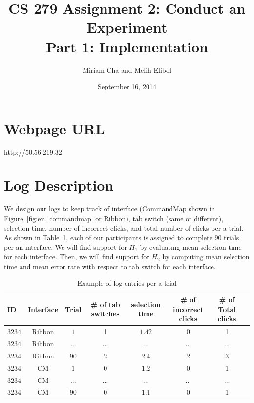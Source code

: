 \documentclass{article}
\title{CS 279 Assignment 2: Conduct an Experiment\\Part 1: Implementation}
\author{Miriam Cha and Melih Elibol}
\date{September 16, 2014}
\begin{document}
\maketitle

\section*{Webpage URL}
http://50.56.219.32
\section*{Log Description} 
 We design our logs to keep track of interface (CommandMap shown in Figure~\ref{fig:ex_commandmap} or Ribbon), tab switch (same or different),  selection time, number of incorrect clicks, and total number of clicks per a trial. As shown in Table~\ref{fig:trial_log}, each of our participants is assigned to complete $90$ trials per an interface. We will find support for $H_1$ by evaluating mean selection time for each interface. Then, we will find support for $H_2$ by computing mean selection time and mean error rate with respect to tab switch for each interface.  
 \begin{table}[tbh]
  \centering
\begin{tabular}{|l|c|c|c|c|c|c|c|}
  \hline
 ID &  Interface  &  Trial &  # of tab switches & selection time & \# of incorrect clicks & \# of Total clicks              \\\hline
 $3234$ &   Ribbon  & $1$  & 1  & $1.42$ & 0  &1 \\ \hline
$3234$  &    Ribbon &   $...$ & ...  & ... &  ... & ...\\\hline       
$3234$  &    Ribbon &   $90$ & 2  & $2.4$ &2  &3 \\\hline      
$3234$  &    CM &   $1$ & 0  & $1.2$ & 0 & 1 \\\hline   
$3234$  &    CM &   $...$ & ...  & ... &  ... & ...\\\hline   
$3234$  &    CM &   $90$ & 0  & $1.1$ & 0 & 1 \\\hline  
\end{tabular}
\caption{Example of log entries per a trial}
\label{fig:trial_log}
\end{table}
\end{document}
